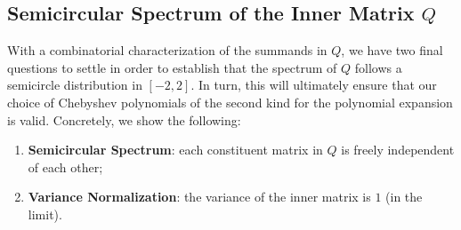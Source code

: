 \documentclass[12pt]{article}
\def \E {\mathbb{E}}
\begin{document}
%

\subsection{Semicircular Spectrum of the Inner Matrix \texorpdfstring{$Q$}{Q}}
With a combinatorial characterization of the summands in $Q$, we have two final questions to settle in order to establish that the spectrum of $Q$ follows a semicircle distribution in $[-2,2]$. In turn, this will ultimately ensure that our choice of Chebyshev polynomials of the second kind for the polynomial expansion is valid. Concretely, we show the following:
  \begin{enumerate}
	\item \textbf{Semicircular Spectrum}: each constituent matrix in $Q$ is freely independent of each other;
	\item \textbf{Variance Normalization}: the variance of the inner matrix is $1$ (in the limit).
\end{enumerate}
\end{document}
